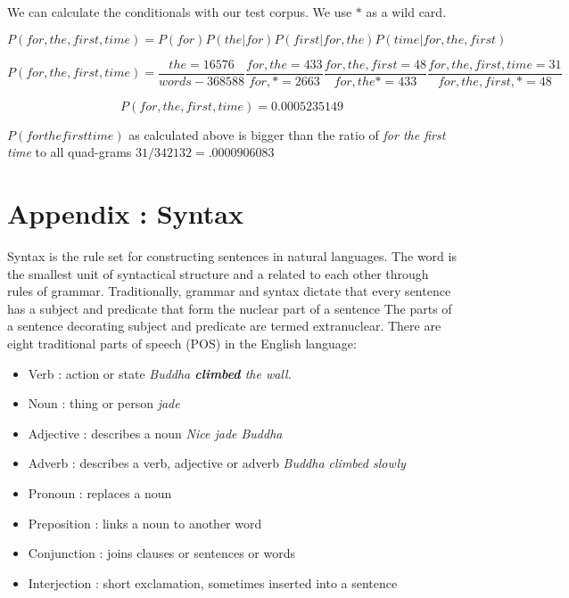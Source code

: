 We can calculate the conditionals with our test corpus.  We use $*$ as a wild card.

\[P(for, the, first, time) = P(for)  P(the | for)  P(first | for, the)  P(time | for, the, first)\]

\[P(for, the, first, time) =  \frac{the=16576}{words-368588}  \frac{for, the =433}{for, * = 2663} \frac{for, the, first =48}{for, the * = 433}  \frac{for, the, first, time  =31}{for, the, first, * = 48} \]

\[P(for, the, first, time) =  0.0005235149\]


$P(for the first time)$ as calculated above is bigger than the ratio of \emph{for the first time} to all quad-grams $31/342132 = .0000906083$


\section{Appendix : Syntax}
Syntax is the rule set for constructing sentences in natural languages.  The word is the smallest unit of syntactical structure and a related to each other through rules of grammar.  Traditionally, grammar and syntax dictate that every sentence has a subject and predicate that form the nuclear part of a sentence  The parts of a sentence decorating subject and predicate are termed extranuclear.
There are eight traditional parts of speech (POS) in the English language:
\begin{itemize}
  \item Verb : action or state \emph{Buddha \textbf{climbed} the wall.}
  \item Noun : thing or person \emph{jade}
  \item Adjective : describes a noun \emph{Nice jade Buddha}
  \item Adverb : describes a verb, adjective or adverb \emph{Buddha climbed slowly}
  \item Pronoun : replaces a noun
  \item Preposition : links a noun to another word
  \item Conjunction : joins clauses or sentences or words
  \item Interjection : short exclamation, sometimes inserted into a sentence
\end{itemize}

